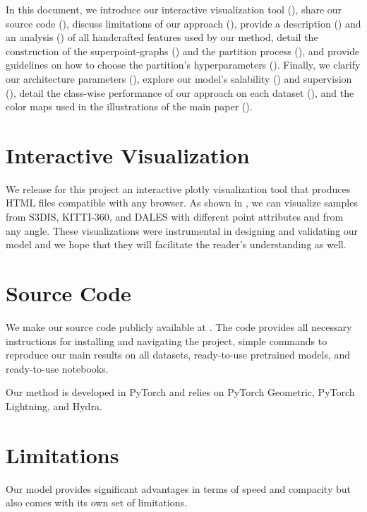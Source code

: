 In this document, we introduce our interactive visualization tool (), share our source code (), discuss limitations of our approach (), provide a description () and an analysis () of all handcrafted features used by our method, detail the construction of the superpoint-graphs () and the partition process (), and provide guidelines on how to choose the partition's hyperparameters (). Finally, we clarify our architecture parameters (), explore our model's salability () and supervision (), detail the class-wise performance of our approach on each dataset (), and the color maps used in the illustrations of the main paper ().

\section{Interactive Visualization}
\label{sec:visu}

We release for this project an interactive plotly visualization tool that produces HTML files compatible with any browser. As shown in , we can visualize samples from S3DIS, KITTI-360, and DALES with different point attributes and from any angle. These visualizations were instrumental in designing and validating our model and we hope that they will facilitate the reader's understanding as well.

\section{Source Code}
\label{sec:code}


We make our source code publicly available at \GITHUB.
The code provides all necessary instructions for installing and navigating the project, simple commands to reproduce our main results on all datasets, ready-to-use pretrained models, and ready-to-use notebooks. 

Our method is developed in PyTorch and relies on PyTorch Geometric, PyTorch Lightning, and Hydra. 

\section{Limitations}
\label{sec:limitations}
Our model provides significant advantages in terms of speed and compacity but  also comes with its own set of limitations.

